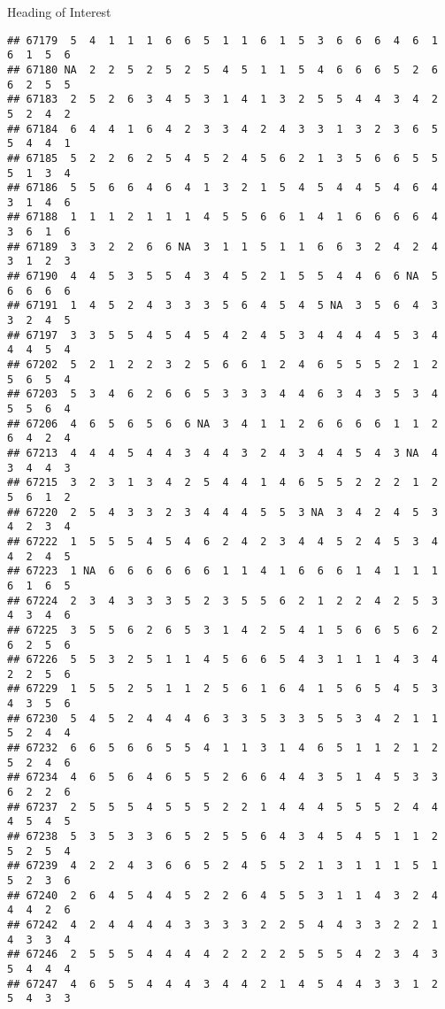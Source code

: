 \documentclass[
  ignorenonframetext,
]{beamer}
\begin{document}
\begin{frame}[fragile]{Heading of Interest}
\begin{verbatim}
## 67179  5  4  1  1  1  6  6  5  1  1  6  1  5  3  6  6  6  4  6  1  6  1  5  6
## 67180 NA  2  2  5  2  5  2  5  4  5  1  1  5  4  6  6  6  5  2  6  6  2  5  5
## 67183  2  5  2  6  3  4  5  3  1  4  1  3  2  5  5  4  4  3  4  2  5  2  4  2
## 67184  6  4  4  1  6  4  2  3  3  4  2  4  3  3  1  3  2  3  6  5  5  4  4  1
## 67185  5  2  2  6  2  5  4  5  2  4  5  6  2  1  3  5  6  6  5  5  5  1  3  4
## 67186  5  5  6  6  4  6  4  1  3  2  1  5  4  5  4  4  5  4  6  4  3  1  4  6
## 67188  1  1  1  2  1  1  1  4  5  5  6  6  1  4  1  6  6  6  6  4  3  6  1  6
## 67189  3  3  2  2  6  6 NA  3  1  1  5  1  1  6  6  3  2  4  2  4  3  1  2  3
## 67190  4  4  5  3  5  5  4  3  4  5  2  1  5  5  4  4  6  6 NA  5  6  6  6  6
## 67191  1  4  5  2  4  3  3  3  5  6  4  5  4  5 NA  3  5  6  4  3  3  2  4  5
## 67197  3  3  5  5  4  5  4  5  4  2  4  5  3  4  4  4  4  5  3  4  4  4  5  4
## 67202  5  2  1  2  2  3  2  5  6  6  1  2  4  6  5  5  5  2  1  2  5  6  5  4
## 67203  5  3  4  6  2  6  6  5  3  3  3  4  4  6  3  4  3  5  3  4  5  5  6  4
## 67206  4  6  5  6  5  6  6 NA  3  4  1  1  2  6  6  6  6  1  1  2  6  4  2  4
## 67213  4  4  4  5  4  4  3  4  4  3  2  4  3  4  4  5  4  3 NA  4  3  4  4  3
## 67215  3  2  3  1  3  4  2  5  4  4  1  4  6  5  5  2  2  2  1  2  5  6  1  2
## 67220  2  5  4  3  3  2  3  4  4  4  5  5  3 NA  3  4  2  4  5  3  4  2  3  4
## 67222  1  5  5  5  4  5  4  6  2  4  2  3  4  4  5  2  4  5  3  4  4  2  4  5
## 67223  1 NA  6  6  6  6  6  6  1  1  4  1  6  6  6  1  4  1  1  1  6  1  6  5
## 67224  2  3  4  3  3  3  5  2  3  5  5  6  2  1  2  2  4  2  5  3  4  3  4  6
## 67225  3  5  5  6  2  6  5  3  1  4  2  5  4  1  5  6  6  5  6  2  6  2  5  6
## 67226  5  5  3  2  5  1  1  4  5  6  6  5  4  3  1  1  1  4  3  4  2  2  5  6
## 67229  1  5  5  2  5  1  1  2  5  6  1  6  4  1  5  6  5  4  5  3  4  3  5  6
## 67230  5  4  5  2  4  4  4  6  3  3  5  3  3  5  5  3  4  2  1  1  5  2  4  4
## 67232  6  6  5  6  6  5  5  4  1  1  3  1  4  6  5  1  1  2  1  2  5  2  4  6
## 67234  4  6  5  6  4  6  5  5  2  6  6  4  4  3  5  1  4  5  3  3  6  2  2  6
## 67237  2  5  5  5  4  5  5  5  2  2  1  4  4  4  5  5  5  2  4  4  4  5  4  5
## 67238  5  3  5  3  3  6  5  2  5  5  6  4  3  4  5  4  5  1  1  2  5  2  5  4
## 67239  4  2  2  4  3  6  6  5  2  4  5  5  2  1  3  1  1  1  5  1  5  2  3  6
## 67240  2  6  4  5  4  4  5  2  2  6  4  5  5  3  1  1  4  3  2  4  4  4  2  6
## 67242  4  2  4  4  4  4  3  3  3  3  2  2  5  4  4  3  3  2  2  1  4  3  3  4
## 67246  2  5  5  5  4  4  4  4  2  2  2  2  5  5  5  4  2  3  4  3  5  4  4  4
## 67247  4  6  5  5  4  4  4  3  4  4  2  1  4  5  4  4  3  3  1  2  5  4  3  3

\end{verbatim}
\end{frame}
\end{document}
